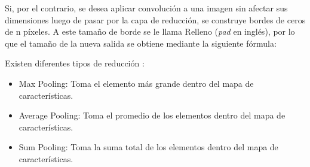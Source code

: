 \begin{itemize}
\begin{itemize}
\begin{itemize}
			Si, por el contrario, se desea aplicar convolución a una imagen sin afectar sus dimensiones luego de pasar por la capa de reducción, se construye bordes de ceros de n píxeles. A este tamaño de borde se le llama Relleno (\textit{pad} en inglés), por lo que el tamaño de la nueva salida se obtiene mediante la siguiente fórmula:
			
			Existen diferentes tipos de reducción \parencite{tec_prabhu2018cnn}:
			\begin{itemize}
				\item Max Pooling: Toma el elemento más grande dentro del mapa de características.
				\item Average Pooling: Toma el promedio de los elementos dentro del mapa de características.
				\item Sum Pooling: Toma la suma total de los elementos dentro del mapa de características.
			\end{itemize}
			

\end{itemize}
\end{itemize}
\end{itemize}

